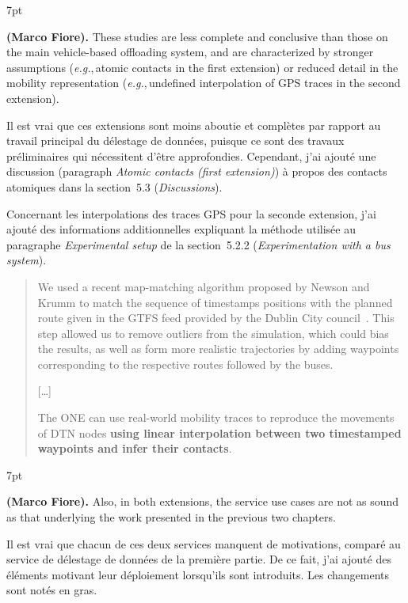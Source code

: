 \documentclass[11pt]{article}
\newcommand{\eg}{\textit{e.g.},\,}
\newenvironment{formal}{%
  \vspace*{-5pt}
  \def\FrameCommand{%
    \hspace{-5pt}%
    {\color{gray50}\vrule width 1.25pt}%
    \colorbox{formalcolor}%
  }%
  \MakeFramed{\advance\hsize-\width\FrameRestore}%
  \noindent\hspace{-4.55pt}%
  \begin{adjustwidth}{}{7pt}%
  \normalsize
  \vspace{-2pt}
}
{%
  \vspace{2pt}\end{adjustwidth}\endMakeFramed%
  \vspace*{-10pt}
}
\begin{document}
\begin{formal}
\textbf{(Marco Fiore).} These studies are less complete and conclusive than those on the main vehicle-based offloading system, and are characterized by stronger assumptions (\eg atomic contacts in the first extension) or reduced detail in the mobility representation (\eg undefined interpolation of GPS traces in the second extension).
\end{formal}

Il est vrai que ces extensions sont moins aboutie et complètes par rapport au travail principal du délestage de données, puisque ce sont des travaux préliminaires qui nécessitent d'être approfondies. Cependant, j'ai ajouté une discussion (paragraph \textit{Atomic contacts (first extension)}) à propos des contacts atomiques dans la section~5.3 (\textit{Discussions}).

Concernant les interpolations des traces GPS pour la seconde extension, j'ai ajouté des informations additionnelles expliquant la méthode utilisée au paragraphe \textit{Experimental setup} de la section~5.2.2 (\textit{Experimentation with a bus system}).

\begin{quote}
We used a recent map-matching algorithm proposed by Newson and Krumm to match the sequence of timestamps positions with the planned route given in the GTFS feed provided by the Dublin City council~\cite{newson2009hidden}. This step allowed us to remove outliers from the simulation, which could bias the results, as well as form more realistic trajectories by adding waypoints corresponding to the respective routes followed by the buses.

\begin{center}
[\dots]
\end{center}

The ONE can use real-world mobility traces to reproduce the movements of DTN nodes \textbf{using linear interpolation between two timestamped waypoints and infer their contacts}.
\end{quote}

\begin{formal}
\textbf{(Marco Fiore).} Also, in both extensions, the service use cases are not as sound as that underlying the work presented in the previous two chapters.
\end{formal}

Il est vrai que chacun de ces deux services manquent de motivations, comparé au service de délestage de données de la première partie. De ce fait, j'ai ajouté des éléments motivant leur déploiement lorsqu'ils sont introduits. Les changements sont notés en gras.
\end{document}
